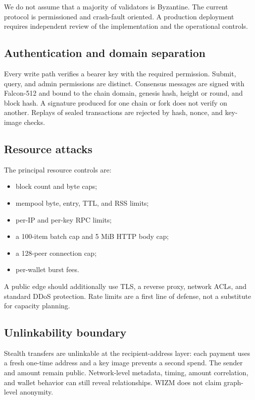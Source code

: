 \documentclass[11pt,a4paper]{article}
\begin{document}
We do not assume that a majority of validators is Byzantine. The current
protocol is permissioned and crash-fault oriented. A production deployment
requires independent review of the implementation and the operational
controls.

\subsection{Authentication and domain separation}

Every write path verifies a bearer key with the required permission. Submit,
query, and admin permissions are distinct. Consensus messages are signed with
Falcon-512 and bound to the chain domain, genesis hash, height or round, and
block hash. A signature produced for one chain or fork does not verify on
another. Replays of sealed transactions are rejected by hash, nonce, and
key-image checks.

\subsection{Resource attacks}

The principal resource controls are:
\begin{itemize}[leftmargin=*]
  \item block count and byte caps;
  \item mempool byte, entry, TTL, and RSS limits;
  \item per-IP and per-key RPC limits;
  \item a 100-item batch cap and 5 MiB HTTP body cap;
  \item a 128-peer connection cap;
  \item per-wallet burst fees.
\end{itemize}

A public edge should additionally use TLS, a reverse proxy, network ACLs, and
standard DDoS protection. Rate limits are a first line of defense, not a
substitute for capacity planning.

\subsection{Unlinkability boundary}

Stealth transfers are unlinkable at the recipient-address layer: each payment
uses a fresh one-time address and a key image prevents a second spend. The
sender and amount remain public. Network-level metadata, timing, amount
correlation, and wallet behavior can still reveal relationships. WIZM does not
claim graph-level anonymity.
\end{document}
